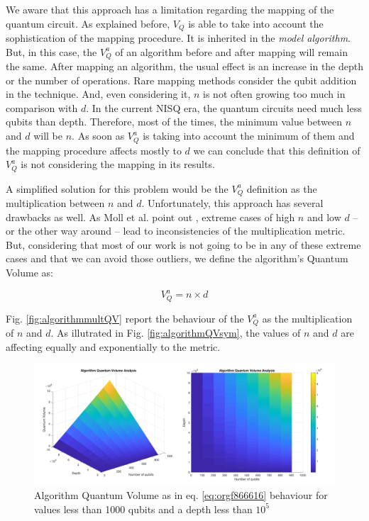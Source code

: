 \begin{itemize}
\begin{itemize}
\begin{itemize}
We aware that this approach has a limitation regarding the mapping of the quantum circuit.
As explained before, \(V_Q\) is able to take into account the sophistication of the mapping procedure.
It is inherited in the \emph{model algorithm}.
But, in this case, the \(V^a_Q\) of an algorithm before and after mapping will remain the same.
After mapping an algorithm, the usual effect is an increase in the depth or the number of operations.
Rare mapping methods consider the qubit addition in the technique.
And, even considering it, \(n\) is not often growing too much in comparison with \(d\).
In the current NISQ era, the quantum circuits need much less qubits than depth.
Therefore, most of the times, the minimum value between \(n\) and \(d\) will be \(n\).
As soon as \(V^a_Q\) is taking into account the minimum of them and the mapping procedure affects mostly to \(d\) we can conclude that this definition of \(V^a_Q\) is not considering the mapping in its results.

A simplified solution for this problem would be the \(V^a_Q\) definition as the multiplication between \(n\) and \(d\).
Unfortunately, this approach has several drawbacks as well.
As Moll et al. point out \cite{Moll_2018}, extreme cases of high \(n\) and low \(d\) -- or the other way around -- lead to inconsistencies of the multiplication metric.
But, considering that most of our work is not going to be in any of these extreme cases and that we can avoid those outliers, we define the algorithm's Quantum Volume as:

\begin{equation}
\label{eq:orgf866616}
V_Q^a =  n \times d
\end{equation}

Fig. \ref{fig:algorithmmultQV} report the behaviour of the \(V_Q^a\) as
the multiplication of \(n\) and \(d\).
As illutrated in Fig. \ref{fig:algorithmQVsym}, the values of \(n\) and \(d\) are
affecting equally and exponentially to the metric.

\begin{figure}[htbp]
\centering
\includegraphics[width=\textwidth]{figures/V_q_analysis_mult.png}
\caption{\label{fig:org812bb56}
Algorithm Quantum Volume as in eq. \ref{eq:orgf866616} behaviour for values less than 1000 qubits and a depth less than \(10^{5}\)}
\end{figure}


\end{itemize}
\end{itemize}
\end{itemize}
